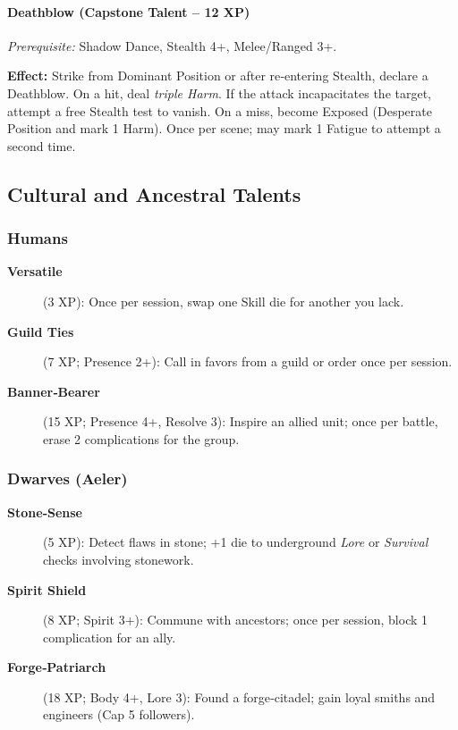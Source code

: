 \paragraph{Deathblow (Capstone Talent -- 12 XP)}
\textit{Prerequisite:} Shadow Dance, Stealth 4+, Melee/Ranged 3+.

\noindent \textbf{Effect:} Strike from Dominant Position or after re‑entering Stealth, declare a Deathblow. On a hit, deal \emph{triple Harm}. If the attack incapacitates the target, attempt a free Stealth test to vanish. On a miss, become Exposed (Desperate Position and mark 1 Harm). Once per scene; may mark 1 Fatigue to attempt a second time.

\subsection{Cultural and Ancestral Talents}\label{subsec:cultural_talents}

\subsubsection{Humans}\label{subsubsec:human_talents}

\begin{description}
    \item[\textbf{Versatile}] (3 XP): Once per session, swap one Skill die for another you lack.
    \item[\textbf{Guild Ties}] (7 XP; Presence 2+): Call in favors from a guild or order once per session.
    \item[\textbf{Banner‑Bearer}] (15 XP; Presence 4+, Resolve 3): Inspire an allied unit; once per battle, erase 2 complications for the group.
\end{description}

\subsubsection{Dwarves (Aeler)}\label{subsubsec:dwarf_talents}

\begin{description}
    \item[\textbf{Stone‑Sense}] (5 XP): Detect flaws in stone; +1 die to underground \emph{Lore} or \emph{Survival} checks involving stonework.
    \item[\textbf{Spirit Shield}] (8 XP; Spirit 3+): Commune with ancestors; once per session, block 1 complication for an ally.
    \item[\textbf{Forge‑Patriarch}] (18 XP; Body 4+, Lore 3): Found a forge‑citadel; gain loyal smiths and engineers (Cap 5 followers).
\end{description}

